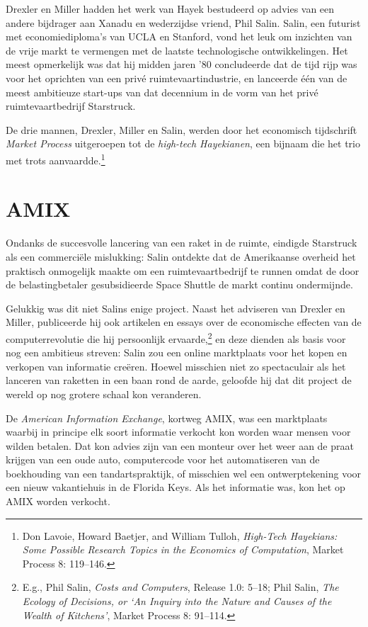 \documentclass[
  a5paper,
  smalldemyvopaper,11pt,twoside,onecolumn,openright,extrafontsizes,
hidelinks]{memoir}
\begin{document}
Drexler en Miller hadden het werk van Hayek bestudeerd op advies van een
andere bijdrager aan Xanadu en wederzijdse vriend, Phil Salin. Salin,
een futurist met economiediploma's van UCLA en Stanford, vond het leuk
om inzichten van de vrije markt te vermengen met de laatste
technologische ontwikkelingen. Het meest opmerkelijk was dat hij midden
jaren '80 concludeerde dat de tijd rijp was voor het oprichten van een
privé ruimtevaartindustrie, en lanceerde één van de meest ambitieuze
start-ups van dat decennium in de vorm van het privé ruimtevaartbedrijf
Starstruck.

De drie mannen, Drexler, Miller en Salin, werden door het economisch
tijdschrift \emph{Market Process} uitgeroepen tot de \emph{high-tech
Hayekianen}, een bijnaam die het trio met trots aanvaardde.\footnote{Don
  Lavoie, Howard Baetjer, and William Tulloh, \emph{High-Tech Hayekians:
  Some Possible Research Topics in the Economics of Computation}, Market
  Process 8: 119--146.}

\section{AMIX}\label{amix}

Ondanks de succesvolle lancering van een raket in de ruimte, eindigde
Starstruck als een commerciële mislukking: Salin ontdekte dat de
Amerikaanse overheid het praktisch onmogelijk maakte om een
ruimtevaartbedrijf te runnen omdat de door de belastingbetaler
gesubsidieerde Space Shuttle de markt continu ondermijnde.

Gelukkig was dit niet Salins enige project. Naast het adviseren van
Drexler en Miller, publiceerde hij ook artikelen en essays over de
economische effecten van de computerrevolutie die hij persoonlijk
ervaarde,\footnote{E.g., Phil Salin, \emph{Costs and Computers}, Release
  1.0: 5--18; Phil Salin, \emph{The Ecology of Decisions, or `An Inquiry
  into the Nature and Causes of the Wealth of Kitchens'}, Market Process
  8: 91--114.} en deze dienden als basis voor nog een ambitieus streven:
Salin zou een online marktplaats voor het kopen en verkopen van
informatie creëren. Hoewel misschien niet zo spectaculair als het
lanceren van raketten in een baan rond de aarde, geloofde hij dat dit
project de wereld op nog grotere schaal kon veranderen.

De \emph{American Information Exchange}, kortweg AMIX, was een
marktplaats waarbij in principe elk soort informatie verkocht kon worden
waar mensen voor wilden betalen. Dat kon advies zijn van een monteur
over het weer aan de praat krijgen van een oude auto, computercode voor
het automatiseren van de boekhouding van een tandartspraktijk, of
misschien wel een ontwerptekening voor een nieuw vakantiehuis in de
Florida Keys. Als het informatie was, kon het op AMIX worden verkocht.
\end{document}
